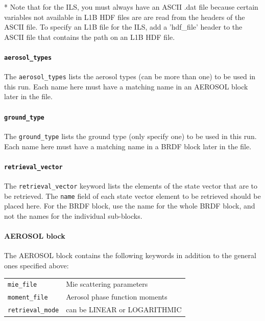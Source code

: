 \documentclass{article}
\begin{document}
* Note that for the ILS, you must always have an ASCII .dat file because
certain variables not available in L1B HDF files are are read from the 
headers of the ASCII file. To specify an L1B file for the ILS, add a
'hdf\_file' header to the ASCII file that contains the path on an L1B
HDF file.

\paragraph{\texttt{aerosol\_types}}

The \texttt{aerosol\_types} lists the aerosol types (can be more than
one) to be used in this run.  Each name here must have a matching name
in an AEROSOL block later in the file.

\paragraph{\texttt{ground\_type}}

The \texttt{ground\_type} lists the ground type (only specify one) to
be used in this run.  Each name here must have a matching name in a
BRDF block later in the file.

\paragraph{\texttt{retrieval\_vector}}

The \texttt{retrieval\_vector} keyword lists the elements of the state
vector that are to be retrieved.  The \texttt{name} field of each
state vector element to be retrieved should be placed here.  For the
BRDF block, use the name for the whole BRDF block, and not the names
for the individual sub-blocks.

\paragraph{AEROSOL block}

The AEROSOL block contains the following keywords in addition to the
general ones specified above:

\begin{tabular}{|l|p{3.75in}|}
\hline
\texttt{mie\_file}  & Mie scattering parameters \\
\texttt{moment\_file}  & Aerosol phase function moments\\
\texttt{retrieval\_mode}  & can be LINEAR or LOGARITHMIC\\
\hline
\end{tabular}
\end{document}
